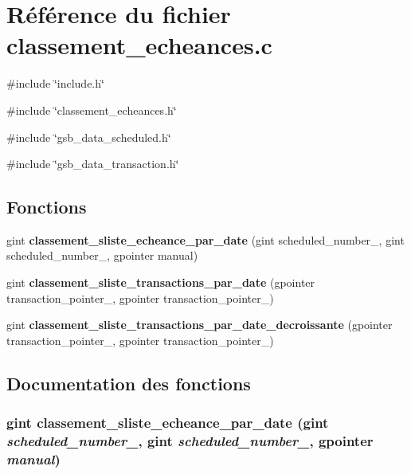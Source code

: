 \section{Référence du fichier classement\_\-echeances.c}
\label{classement__echeances_8c}
{\ttfamily \#include \char`\"{}include.h\char`\"{}}\par
{\ttfamily \#include \char`\"{}classement\_\-echeances.h\char`\"{}}\par
{\ttfamily \#include \char`\"{}gsb\_\-data\_\-scheduled.h\char`\"{}}\par
{\ttfamily \#include \char`\"{}gsb\_\-data\_\-transaction.h\char`\"{}}\par
\subsection*{Fonctions}
\begin{DoxyCompactItemize}
\item 
gint {\bf classement\_\-sliste\_\-echeance\_\-par\_\-date} (gint scheduled\_\-number\_, gint scheduled\_\-number\_, gpointer manual)
\item 
gint {\bf classement\_\-sliste\_\-transactions\_\-par\_\-date} (gpointer transaction\_\-pointer\_, gpointer transaction\_\-pointer\_)
\item 
gint {\bf classement\_\-sliste\_\-transactions\_\-par\_\-date\_\-decroissante} (gpointer transaction\_\-pointer\_, gpointer transaction\_\-pointer\_)
\end{DoxyCompactItemize}


\subsection{Documentation des fonctions}
\subsubsection[{classement\_\-sliste\_\-echeance\_\-par\_\-date}]{\setlength{\rightskip}{0pt plus 5cm}gint classement\_\-sliste\_\-echeance\_\-par\_\-date (gint {\em scheduled\_\-number\_}, \/  gint {\em scheduled\_\-number\_}, \/  gpointer {\em manual})}\label{classement__echeances_8c_af017713fbadf31f7b537329b389515d1}


